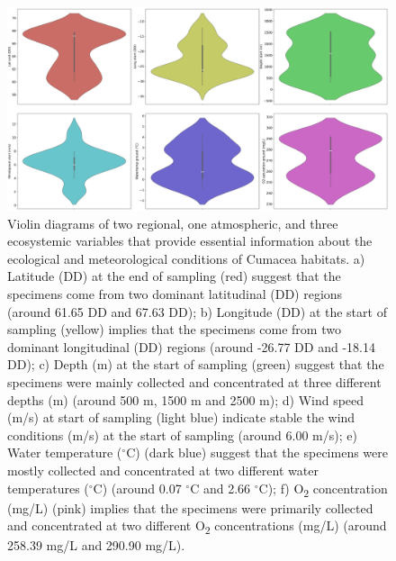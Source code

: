 \begin{figure}[htbp]
    \centering
    \includegraphics[width=\textwidth]{figure1.jpg}
    \caption{Violin diagrams of two regional, one atmospheric, and three ecosystemic variables that provide essential information about the ecological and meteorological conditions of Cumacea habitats. a) Latitude (DD) at the end of sampling (red) suggest that the specimens come from two dominant latitudinal (DD) regions (around 61.65 DD and 67.63 DD); b) Longitude (DD) at the start of sampling (yellow) implies that the specimens come from two dominant longitudinal (DD) regions (around -26.77 DD and -18.14 DD); c) Depth (m) at the start of sampling (green) suggest that the specimens were mainly collected and concentrated at three different depths (m) (around 500 m, 1500 m and 2500 m); d) Wind speed (m/s) at start of sampling (light blue) indicate stable the wind conditions (m/s) at the start of sampling (around 6.00 m/s); e) Water temperature ($^\circ$C) (dark blue) suggest that the specimens were mostly collected and concentrated at two different water temperatures ($^\circ$C) (around 0.07 $^\circ$C and 2.66 $^\circ$C); f) O\textsubscript{2} concentration (mg/L) (pink) implies that the specimens were primarily collected and concentrated at two different O\textsubscript{2} concentrations (mg/L) (around 258.39 mg/L and 290.90 mg/L). \label{fig:fig3}}
\end{figure}

